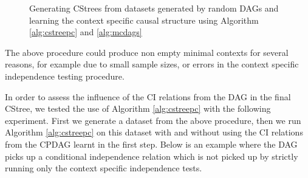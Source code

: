 \documentclass{tufte-book}
\begin{document}
\begin{Definition}
\begin{figure}[!h]\label{fig:synthetic_exp1}
   \begin{floatrow}
%
\caption{Generating CStrees from datasets generated by random DAGs and learning the context specific causal structure using Algorithm \ref{alg:cstreepc} and \ref{alg:mcdags}}
        
   \end{floatrow}
\end{figure}


The above procedure could produce non empty minimal contexts for several reasons, for example due to small sample sizes, or errors in the context specific independence testing procedure.






In order to assess the influence of the CI relations from the DAG in the final CStree, we tested the use of Algorithm \ref{alg:cstreepc} with the following experiment. First we generate a dataset from the above procedure, then we run Algorithm \ref{alg:cstreepc} on this dataset with and without using the CI relations from the CPDAG learnt in the first step. Below is an example where the DAG picks up a conditional independence relation which is not picked up by strictly running only the context specific independence tests.



\end{Definition}
\end{document}
